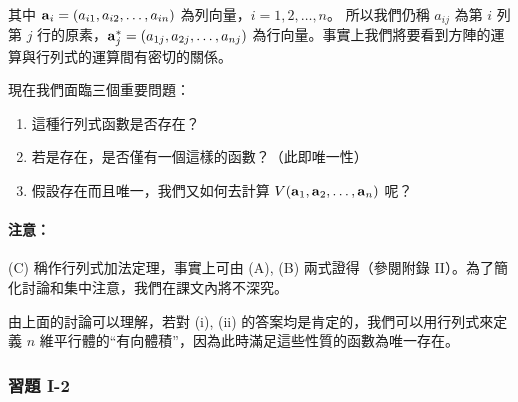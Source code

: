 其中 $\boldsymbol{\mathbf{a}}_i=(a_{i1}, a_{i2}, \dots, a_{in})$ 為列向量，$i=1, 2, \dots, n$。
所以我們仍稱 $a_{ij}$ 為第 $i$ 列第 $j$ 行的原素，$\boldsymbol{\mathbf{a}}_j^*=(a_{1j}, a_{2j}, \dots, a_{nj})$ 為行向量。事實上我們將要看到方陣的運算與行列式的運算間有密切的關係。

現在我們面臨三個重要問題：
\begin{enumerate}[label=(\roman*), leftmargin=2em]
  \item 這種行列式函數是否存在？
  \item 若是存在，是否僅有一個這樣的函數？（此即唯一性）
  \item 假設存在而且唯一，我們又如何去計算 $V(\boldsymbol{\mathbf{a}}_1, \boldsymbol{\mathbf{a}}_2, \dots, \boldsymbol{\mathbf{a}}_n)$ 呢？
\end{enumerate}

\paragraph{注意：}(C) 稱作行列式加法定理，事實上可由 (A), (B) 兩式證得（參閱附錄 II）。為了簡化討論和集中注意，我們在課文內將不深究。

由上面的討論可以理解，若對 (i), (ii) 的答案均是肯定的，我們可以用行列式來定義 $n$ 維平行體的“有向體積”，因為此時滿足這些性質的函數為唯一存在。

\subsubsection*{習題 I-2}\label{sec:b6s-ex1-2}

